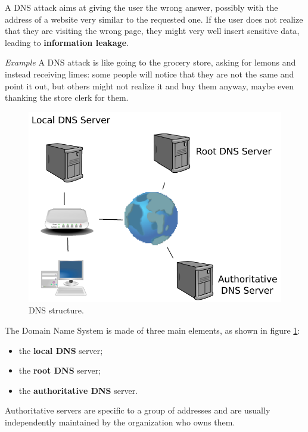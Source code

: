 A DNS attack aims at giving the user the wrong answer, possibly with the address of a website very similar to the requested one. If the user does not realize that they are visiting the wrong page, they might very well insert sensitive data, leading to \textbf{information leakage}.

\vspace{0.5em}

\emph{Example} A DNS attack is like going to the grocery store, asking for lemons and instead receiving limes: some people will notice that they are not the same and point it out, but others might not realize it and buy them anyway, maybe even thanking the store clerk for them.

\vspace{0.5em}

\begin{figure}[h]
    \centering
    \includegraphics[scale=0.5]{img/dns_diagram.png}
    \decoRule
    \caption{DNS structure.}
    \label{fig:dns_diagram}
\end{figure}

The Domain Name System is made of three main elements, as shown in figure \ref{fig:dns_diagram}:

\begin{itemize}
	\item the \textbf{local DNS} server;
\item the \textbf{root DNS} server;
\item the \textbf{authoritative DNS} server.
\end{itemize}

Authoritative servers are specific to a group of addresses and are usually independently maintained by the organization who owns them.

